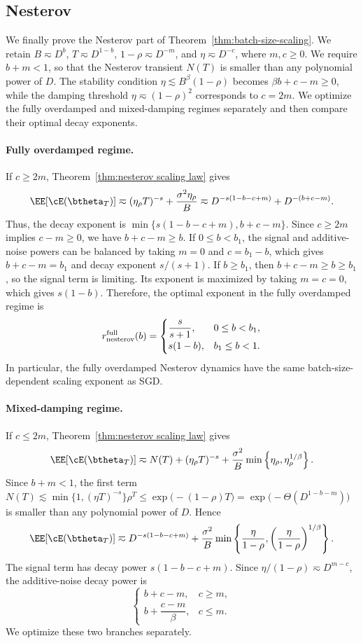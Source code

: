 \documentclass[11pt]{article}
\newcommand{\nesterov}{\mathrm{nesterov}}
\begin{document}
\subsection{Nesterov}
We finally prove the Nesterov part of Theorem~\ref{thm:batch-size-scaling}. We retain $B\eqsim D^b$, $T\eqsim D^{1-b}$, $1-\rho\eqsim D^{-m}$, and $\eta\eqsim D^{-c}$, where $m,c\ge0$. We require $b+m<1$, so that the Nesterov transient $N(T)$ is smaller than any polynomial power of $D$. The stability condition $\eta\lesssim B^\beta(1-\rho)$ becomes $\beta b+c-m\ge0$, while the damping threshold $\eta\eqsim(1-\rho)^2$ corresponds to $c=2m$. We optimize the fully overdamped and mixed-damping regimes separately and then compare their optimal decay exponents.

\paragraph{Fully overdamped regime.} If $c\ge2m$, Theorem~\ref{thm:nesterov scaling law} gives
\[
\EE[\cE(\btheta_T)]\eqsim(\eta_\rho T)^{-s}+\frac{\sigma^2\eta_\rho}{B}\eqsim D^{-s(1-b-c+m)}+D^{-(b+c-m)}.
\]
Thus, the decay exponent is $\min\{s(1-b-c+m),b+c-m\}$. Since $c\ge2m$ implies $c-m\ge0$, we have $b+c-m\ge b$. If $0\le b<b_1$, the signal and additive-noise powers can be balanced by taking $m=0$ and $c=b_1-b$, which gives $b+c-m=b_1$ and decay exponent $s/(s+1)$. If $b\ge b_1$, then $b+c-m\ge b\ge b_1$, so the signal term is limiting. Its exponent is maximized by taking $m=c=0$, which gives $s(1-b)$. Therefore, the optimal exponent in the fully overdamped regime is
\[
r_{\nesterov}^{\rm full}(b)=
\begin{cases}
\dfrac{s}{s+1},&0\le b<b_1,\\[4pt]
s(1-b),&b_1\le b<1.
\end{cases}
\]
In particular, the fully overdamped Nesterov dynamics have the same batch-size-dependent scaling exponent as SGD.
\paragraph{Mixed-damping regime.} If $c\le2m$, Theorem~\ref{thm:nesterov scaling law} gives
\[
\EE[\cE(\btheta_T)]
\eqsim
N(T)
+(\eta_\rho T)^{-s}
+\frac{\sigma^2}{B}\min\left\{\eta_\rho,\eta_\rho^{1/\beta}\right\}.
\]
Since $b+m<1$, the first term \(N(T)\lesssim \min\{1,(\eta T)^{-s}\}\rho^T\leq\exp\bigl(-(1-\rho)T\bigr)=\exp\bigl(-\Theta(D^{1-b-m})\bigr)\) is smaller than any polynomial power of $D$. Hence
\[
\EE[\cE(\btheta_T)]\eqsim D^{-s(1-b-c+m)}+\frac{\sigma^2}{B}\min\left\{\frac{\eta}{1-\rho},\left(\frac{\eta}{1-\rho}\right)^{1/\beta}\right\}.
\]
The signal term has decay power $s(1-b-c+m)$. Since $\eta/(1-\rho)\eqsim D^{m-c}$, the additive-noise decay power is
\[
\begin{cases}
b+c-m,&c\ge m,\\[4pt]
b+\dfrac{c-m}{\beta},&c\le m.
\end{cases}
\]
We optimize these two branches separately.
\end{document}

